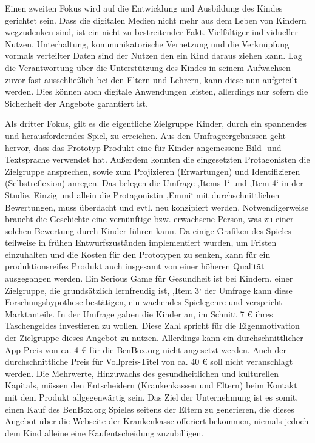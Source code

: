 \documentclass[
  a4paper,
  DIV=11,
  numbers=noendperiod,
  onecolumn,
  oneside,
  a4paper]{scrartcl}
\begin{document}
Einen zweiten Fokus wird auf die Entwicklung und Ausbildung des Kindes
gerichtet sein. Dass die digitalen Medien nicht mehr aus dem Leben von
Kindern wegzudenken sind, ist ein nicht zu bestreitender Fakt.
Vielfältiger individueller Nutzen, Unterhaltung, kommunikatorische
Vernetzung und die Verknüpfung vormals verteilter Daten sind der Nutzen
den ein Kind daraus ziehen kann. Lag die Verantwortung über die
Unterstützung des Kindes in seinem Aufwachsen zuvor fast ausschließlich
bei den Eltern und Lehrern, kann diese nun aufgeteilt werden. Dies
können auch digitale Anwendungen leisten, allerdings nur sofern die
Sicherheit der Angebote garantiert ist.

Als dritter Fokus, gilt es die eigentliche Zielgruppe Kinder, durch ein
spannendes und herausforderndes Spiel, zu erreichen. Aus den
Umfrageergebnissen geht hervor, dass das Prototyp-Produkt eine für
Kinder angemessene Bild- und Textsprache verwendet hat. Außerdem konnten
die eingesetzten Protagonisten die Zielgruppe ansprechen, sowie zum
Projizieren (Erwartungen) und Identifizieren (Selbstreflexion) anregen.
Das belegen die Umfrage ‚Items 1` und ‚Item 4` in der Studie. Einzig und
allein die Protagonistin ‚Emmi` mit durchschnittlichen Bewertungen, muss
überdacht und evtl. neu konzipiert werden. Notwendigerweise braucht die
Geschichte eine vernünftige bzw. erwachsene Person, was zu einer solchen
Bewertung durch Kinder führen kann. Da einige Grafiken des Spieles
teilweise in frühen Entwurfszuständen implementiert wurden, um Fristen
einzuhalten und die Kosten für den Prototypen zu senken, kann für ein
produktionsreifes Produkt auch insgesamt von einer höheren Qualität
ausgegangen werden. Ein Serious Game für Gesundheit ist bei Kindern,
einer Zielgruppe, die grundsätzlich lernfreudig ist, ‚Item 3` der
Umfrage kann diese Forschungshypothese bestätigen, ein wachendes
Spielegenre und verspricht Marktanteile. In der Umfrage gaben die Kinder
an, im Schnitt 7 € ihres Taschengeldes investieren zu wollen. Diese Zahl
spricht für die Eigenmotivation der Zielgruppe dieses Angebot zu nutzen.
Allerdings kann ein durchschnittlicher App-Preis von ca. 4 € für die
BenBox.org nicht angesetzt werden. Auch der durchschnittliche Preis für
Vollpreis-Titel von ca. 40 € soll nicht veranschlagt werden. Die
Mehrwerte, Hinzuwachs des gesundheitlichen und kulturellen Kapitals,
müssen den Entscheidern (Krankenkassen und Eltern) beim Kontakt mit dem
Produkt allgegenwärtig sein. Das Ziel der Unternehmung ist es somit,
einen Kauf des BenBox.org Spieles seitens der Eltern zu generieren, die
dieses Angebot über die Webseite der Krankenkasse offeriert bekommen,
niemals jedoch dem Kind alleine eine Kaufentscheidung zuzubilligen.
\end{document}
